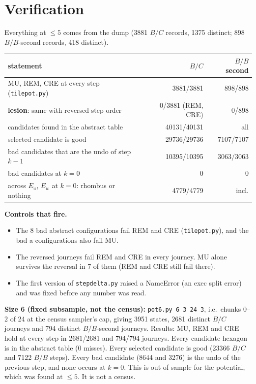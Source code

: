 \documentclass[11pt]{article}
\theoremstyle{definition}\newtheorem{definition}[theorem]{Definition}\newtheorem{remark}[theorem]{Remark}
\begin{document}
\section{Verification}\label{sec:ver}
Everything at $\le5$ comes from the dump (3881 $B/C$ records, 1375 distinct; 898 $B/B$-second records, 418 distinct).
\begin{center}\begin{tabular}{lrr}\toprule
statement & $B/C$ & $B/B$ second\\\midrule
MU, REM, CRE at every step (\texttt{tilepot.py}) & 3881/3881 & 898/898\\
\textbf{lesion}: same with reversed step order & 0/3881 (REM, CRE) & 0/898\\
candidates found in the abstract table & 40131/40131 & all\\
selected candidate is good & 29736/29736 & 7107/7107\\
bad candidates that are the undo of step $k-1$ & 10395/10395 & 3063/3063\\
bad candidates at $k=0$ & 0 & 0\\
across $E_u$, $E_w$ at $k=0$: rhombus or nothing & 4779/4779 & incl.\\\bottomrule
\end{tabular}\end{center}
\noindent\textbf{Controls that fire.}
\begin{itemize}
\item The 8 bad abstract configurations fail REM and CRE (\texttt{tilepot.py}), and the bad a-configurations also fail MU.
\item The reversed journeys fail REM and CRE in every journey. MU alone survives the reversal in 7 of them (REM and CRE still fail there).
\item The first version of \texttt{stepdelta.py} raised a NameError (an exec split error) and was fixed before any number was read.
\end{itemize}
\noindent\textbf{Size 6 (fixed subsample, not the census):} \texttt{pot6.py 6 3 24 3}, i.e.\ chunks 0--2 of 24 at the census sampler's cap, giving 3951 states, 2681 distinct $B/C$ journeys and 794 distinct $B/B$-second journeys. Results:
MU, REM and CRE hold at every step in 2681/2681 and 794/794 journeys. Every candidate hexagon is in the abstract table (0 misses). Every selected candidate is good (23366 $B/C$ and 7122 $B/B$ steps). Every bad candidate (8644 and 3276) is the undo of the previous step, and none occurs at $k=0$.
This is out of sample for the potential, which was found at $\le5$. It is not a census.
\end{document}
